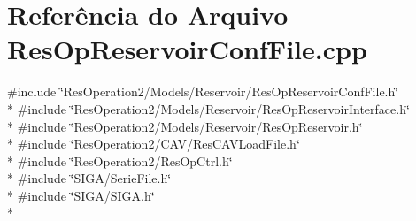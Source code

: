 \section{Referência do Arquivo Res\+Op\+Reservoir\+Conf\+File.\+cpp}
\label{_res_op_reservoir_conf_file_8cpp}
{\ttfamily \#include \char`\"{}Res\+Operation2/\+Models/\+Reservoir/\+Res\+Op\+Reservoir\+Conf\+File.\+h\char`\"{}}\\*
{\ttfamily \#include \char`\"{}Res\+Operation2/\+Models/\+Reservoir/\+Res\+Op\+Reservoir\+Interface.\+h\char`\"{}}\\*
{\ttfamily \#include \char`\"{}Res\+Operation2/\+Models/\+Reservoir/\+Res\+Op\+Reservoir.\+h\char`\"{}}\\*
{\ttfamily \#include \char`\"{}Res\+Operation2/\+C\+A\+V/\+Res\+C\+A\+V\+Load\+File.\+h\char`\"{}}\\*
{\ttfamily \#include \char`\"{}Res\+Operation2/\+Res\+Op\+Ctrl.\+h\char`\"{}}\\*
{\ttfamily \#include \char`\"{}S\+I\+G\+A/\+Serie\+File.\+h\char`\"{}}\\*
{\ttfamily \#include \char`\"{}S\+I\+G\+A/\+S\+I\+G\+A.\+h\char`\"{}}\\*
